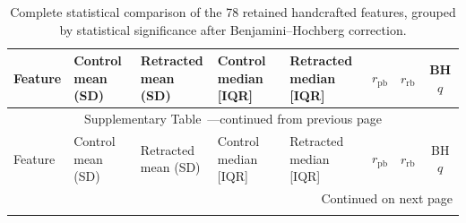 
\clearpage
\onecolumn
\begin{landscape}
\scriptsize
\setlength{\tabcolsep}{2.5pt}
\renewcommand{\arraystretch}{1.08}
\setcounter{table}{0}
\renewcommand{\thetable}{\arabic{table}}
\renewcommand{\tablename}{Supplementary Table}


\begin{longtable}{@{}p{5.2cm}p{2.65cm}p{2.65cm}p{2.85cm}p{2.85cm}ccc@{}}
\caption{Complete statistical comparison of the 78 retained handcrafted features, grouped by statistical significance after Benjamini--Hochberg correction.}
\label{tab:supplementary-feature-statistics}\\

\toprule
Feature &
\shortstack{Control\\mean (SD)} &
\shortstack{Retracted\\mean (SD)} &
\shortstack{Control\\median [IQR]} &
\shortstack{Retracted\\median [IQR]} &
$r_{\mathrm{pb}}$ &
$r_{\mathrm{rb}}$ &
BH $q$ \\
\midrule
\endfirsthead

\multicolumn{8}{c}{\tablename\ \thetable{}---continued from previous page}\\
\toprule
Feature &
\shortstack{Control\\mean (SD)} &
\shortstack{Retracted\\mean (SD)} &
\shortstack{Control\\median [IQR]} &
\shortstack{Retracted\\median [IQR]} &
$r_{\mathrm{pb}}$ &
$r_{\mathrm{rb}}$ &
BH $q$ \\
\midrule
\endhead

\midrule
\multicolumn{8}{r}{Continued on next page}\\
\endfoot


\end{longtable}
\end{landscape}
